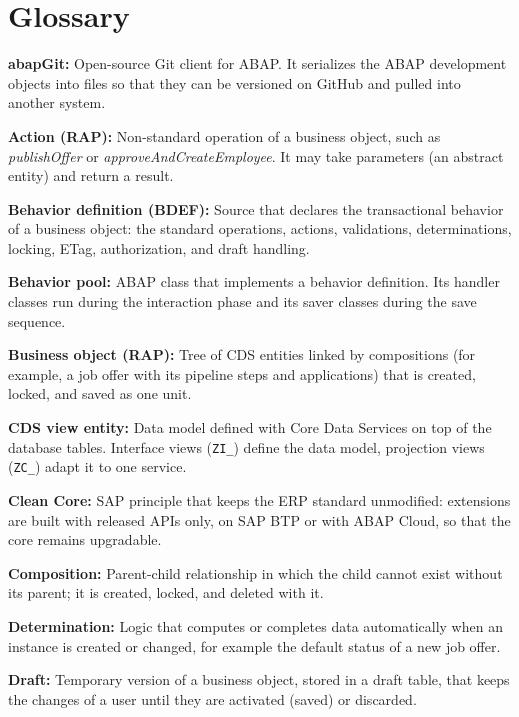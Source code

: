 \chapter{Glossary}
\label{chap:Glossary}

\begingroup
\setlength{\parskip}{6pt}
\sloppy

\noindent\textbf{abapGit:} Open-source Git client for ABAP. It serializes the ABAP development objects into files so that they can be versioned on GitHub and pulled into another system.

\noindent\textbf{Action (RAP):} Non-standard operation of a business object, such as \emph{publishOffer} or \emph{approveAndCreateEmployee}. It may take parameters (an abstract entity) and return a result.

\noindent\textbf{Behavior definition (BDEF):} Source that declares the transactional behavior of a business object: the standard operations, actions, validations, determinations, locking, ETag, authorization, and draft handling.

\noindent\textbf{Behavior pool:} ABAP class that implements a behavior definition. Its handler classes run during the interaction phase and its saver classes during the save sequence.

\noindent\textbf{Business object (RAP):} Tree of CDS entities linked by compositions (for example, a job offer with its pipeline steps and applications) that is created, locked, and saved as one unit.

\noindent\textbf{CDS view entity:} Data model defined with Core Data Services on top of the database tables. Interface views (\texttt{ZI\_}) define the data model, projection views (\texttt{ZC\_}) adapt it to one service.

\noindent\textbf{Clean Core:} SAP principle that keeps the ERP standard unmodified: extensions are built with released APIs only, on SAP BTP or with ABAP Cloud, so that the core remains upgradable.

\noindent\textbf{Composition:} Parent-child relationship in which the child cannot exist without its parent; it is created, locked, and deleted with it.

\noindent\textbf{Determination:} Logic that computes or completes data automatically when an instance is created or changed, for example the default status of a new job offer.

\noindent\textbf{Draft:} Temporary version of a business object, stored in a draft table, that keeps the changes of a user until they are activated (saved) or discarded.

